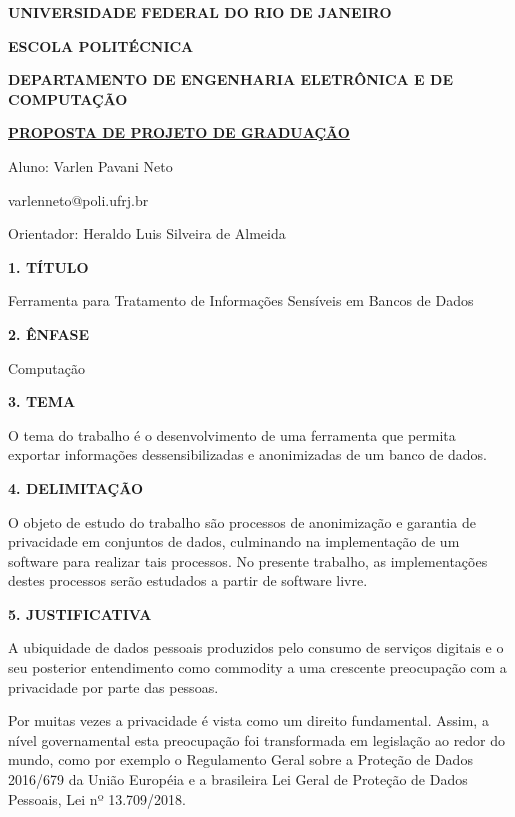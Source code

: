 \documentclass[a4paper,12pt,oneside,openany]{report}
\begin{document}
\begin{center}
\textbf{UNIVERSIDADE FEDERAL DO RIO DE JANEIRO}
\vspace{-0.2cm}

\textbf{ESCOLA POLITÉCNICA}
\vspace{-0.2cm}

\textbf{DEPARTAMENTO DE ENGENHARIA ELETRÔNICA E DE COMPUTAÇÃO}
\vspace{0.8cm}

\underline{\textbf{PROPOSTA DE PROJETO DE GRADUAÇÃO}}

Aluno: Varlen Pavani Neto
\vspace{-0.2cm}

varlenneto@poli.ufrj.br

Orientador: Heraldo Luis Silveira de Almeida
\end{center}

\textbf{1. TÍTULO}

	Ferramenta para Tratamento de Informações Sensíveis em Bancos de Dados

\vspace{0.4cm}
\textbf{2. ÊNFASE}

Computação

\vspace{0.4cm}
\textbf{3. TEMA}

O tema do trabalho é o desenvolvimento de uma ferramenta que permita exportar informações dessensibilizadas e anonimizadas de um banco de dados.

\vspace{0.4cm}
\textbf{4. DELIMITAÇÃO}

O objeto de estudo do trabalho são processos de anonimização e garantia de privacidade em conjuntos de dados,
culminando na implementação de um software para realizar tais processos. No presente trabalho, as implementações destes processos serão estudados a partir de software livre.

\vspace{0.4cm}
\textbf{5. JUSTIFICATIVA}

A ubiquidade de dados pessoais produzidos pelo consumo de serviços digitais e o seu posterior entendimento como commodity \cite{jmeyer} a uma crescente preocupação com a privacidade por parte das pessoas. 

Por muitas vezes a privacidade é vista como um direito fundamental\cite{solove}. Assim, a nível governamental esta preocupação foi transformada em legislação ao redor do mundo, como por exemplo o Regulamento Geral sobre a Proteção de Dados 2016/679 da União Européia e a brasileira Lei Geral de Proteção de Dados Pessoais, Lei nº 13.709/2018.
\end{document}
